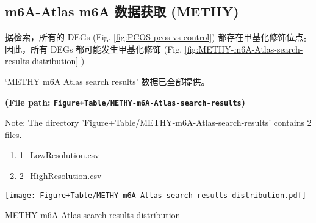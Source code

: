 \documentclass[
]{article}
\providecommand{\tightlist}{%
  \setlength{\itemsep}{0pt}\setlength{\parskip}{0pt}}
\begin{document}
\begin{center}\vspace{1.5cm}\end{center}

\hypertarget{m6a-atlas-m6a-ux6570ux636eux83b7ux53d6-methy}{%
\subsection{m6A-Atlas m6A 数据获取 (METHY)}\label{m6a-atlas-m6a-ux6570ux636eux83b7ux53d6-methy}}

据检索，所有的 DEGs (Fig. \ref{fig:PCOS-pcos-vs-control}) 都存在甲基化修饰位点。
因此，所有 DEGs 都可能发生甲基化修饰 (Fig. \ref{fig:METHY-m6A-Atlas-search-results-distribution} )

\begin{center}\vspace{1.5cm}\end{center}

`METHY m6A Atlas search results' 数据已全部提供。

\textbf{(File path: \texttt{Figure+Table/METHY-m6A-Atlas-search-results})}

\begin{center}\begin{tcolorbox}[colback=gray!10, colframe=gray!50, width=0.9\linewidth, arc=1mm, boxrule=0.5pt]Note: The directory 'Figure+Table/METHY-m6A-Atlas-search-results' contains 2 files.

\begin{enumerate}\tightlist
\item 1\_LowResolution.csv
\item 2\_HighResolution.csv
\end{enumerate}\end{tcolorbox}
\end{center}

\begin{center}\vspace{1.5cm}\end{center}

\begin{center}\vspace{1.5cm}\end{center}
\def\@captype{figure}
\begin{center}
\texttt{[image: Figure+Table/METHY-m6A-Atlas-search-results-distribution.pdf]}
\caption{METHY m6A Atlas search results distribution}\label{fig:METHY-m6A-Atlas-search-results-distribution}
\end{center}
\end{document}

